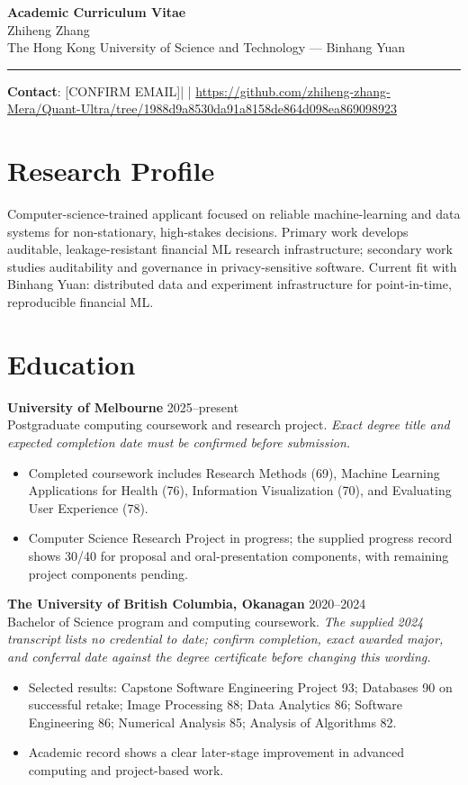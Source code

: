 \documentclass[11pt]{article}
\newcommand{\ApplicantName}{Zhiheng Zhang}
\newcommand{\ApplicantEmail}{[CONFIRM EMAIL]}
\newcommand{\ApplicantPhone}{[CONFIRM PHONE]}
\newcommand{\ApplicantGitHub}{\url{https://github.com/zhiheng-zhang-Mera/Quant-Ultra/tree/1988d9a8530da91a8158de864d098ea869098923}}
\begin{document}
\begin{center}
{\LARGE\bfseries Academic Curriculum Vitae}\\[0.25em]
{\large \ApplicantName}\\
The Hong Kong University of Science and Technology --- Binhang Yuan
\end{center}
\vspace{0.35em}\hrule\vspace{0.65em}

\textbf{Contact}: \ApplicantEmail\quad | \quad \ApplicantPhone\quad | \quad \ApplicantGitHub

\section*{Research Profile}
Computer-science-trained applicant focused on reliable machine-learning and data systems for non-stationary, high-stakes decisions. Primary work develops auditable, leakage-resistant financial ML research infrastructure; secondary work studies auditability and governance in privacy-sensitive software. Current fit with Binhang Yuan: distributed data and experiment infrastructure for point-in-time, reproducible financial ML.

\section*{Education}
\textbf{University of Melbourne} \hfill 2025--present\\
Postgraduate computing coursework and research project. \textit{Exact degree title and expected completion date must be confirmed before submission.}
\begin{itemize}
\item Completed coursework includes Research Methods (69), Machine Learning Applications for Health (76), Information Visualization (70), and Evaluating User Experience (78).
\item Computer Science Research Project in progress; the supplied progress record shows 30/40 for proposal and oral-presentation components, with remaining project components pending.
\end{itemize}

\textbf{The University of British Columbia, Okanagan} \hfill 2020--2024\\
Bachelor of Science program and computing coursework. \textit{The supplied 2024 transcript lists no credential to date; confirm completion, exact awarded major, and conferral date against the degree certificate before changing this wording.}
\begin{itemize}
\item Selected results: Capstone Software Engineering Project 93; Databases 90 on successful retake; Image Processing 88; Data Analytics 86; Software Engineering 86; Numerical Analysis 85; Analysis of Algorithms 82.
\item Academic record shows a clear later-stage improvement in advanced computing and project-based work.
\end{itemize}
\end{document}
